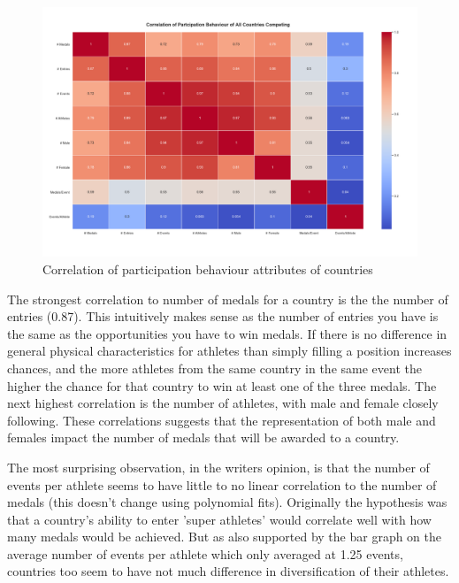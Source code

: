 \documentclass[a4 paper, 12pt]{article}
\begin{document}
        \begin{figure} [H]
            \centering
            \includegraphics[width=\textwidth, frame]
                {./images/graph/countries_stats_heatmap.png}      
                \caption{Correlation of participation behaviour attributes of countries } 
        \end{figure}

        The strongest correlation to number of medals for a country is the the number of entries (0.87). This intuitively makes sense as the number of entries you have is the same as the opportunities you have to win medals. If there is no difference in general physical characteristics for athletes than simply filling a position increases chances, and the more athletes from the same country in the same event the higher the chance for that country to win at least one of the three medals. The next highest correlation is the number of athletes, with male and female closely following. These correlations suggests that the representation of both male and females impact the number of medals that will be awarded to a country. 
        
        The most surprising observation, in the writers opinion, is that the number of events per athlete seems to have little to no linear correlation to the number of medals (this doesn't change using polynomial fits). Originally the hypothesis was that a country's ability to enter 'super athletes' would correlate well with how many medals would be achieved. But as also supported by the bar graph on the average number of events per athlete which only averaged at 1.25 events, countries too seem to have not much difference in diversification of their athletes.
\end{document}
